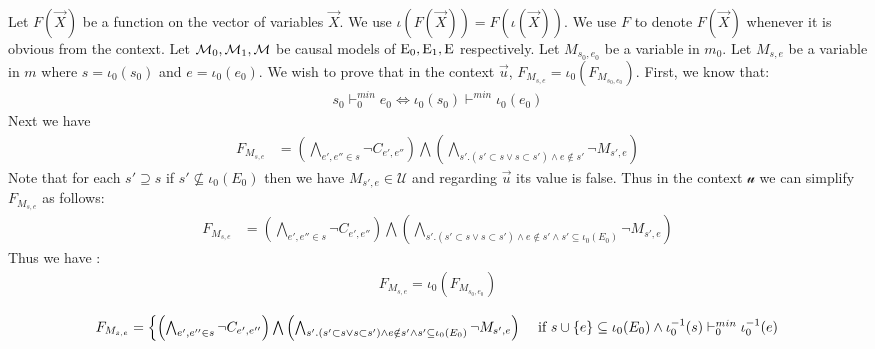 Let $F(\vec X)$ be a function on the vector of variables $\vec X$.
We use $\iota(F(\vec X)) = F(\iota(\vec X))$.
We use $F$ to denote $F(\vec X)$ whenever it is obvious from the context.
Let $\mathcal{M}_0,\mathcal{M}_1,\mathcal{M}$ be causal models of $\mathrm{E}_0,\mathrm{E}_1,\mathrm{E}$ respectively.
Let $M_{s_0,e_0}$ be a variable in $m_0$.
Let $M_{s,e}$ be a variable in $m$ where $s = \iota_0(s_0)$ and $e = \iota_0(e_0)$.
We wish to prove that in the context $\vec u$,
$F_{M_{s,e}} = \iota_0(F_{M_{s_0,e_0}})$.
First, we know that:
\begin{align*}
    s_0 \vdash_0^{min} e_0 \iff \iota_0(s_0) \vdash^{min} \iota_0(e_0)
\end{align*}
Next we have
\begin{align*}
    F_{M_{s,e}} & =
    \left(
    \bigwedge_{ e',e'' \in s}
    \neg C_{e',e''}
    \right) \bigwedge
    \left(
    \bigwedge_{s'. (s' \subset s \vee s \subset s')
        \wedge e \notin s'}
    \neg M_{s',e}
    \right)
\end{align*}
Note that for each $s' \supseteq s$ if $s' \not \subseteq \iota_0(E_0)$ then
we have $M_{s',e} \in \mathcal{U}$ and regarding $\vec u$ its value is false.
Thus in the context $\mathcal{u}$ we can simplify $F_{M_{s,e}}$ as follows:
\begin{align*}
    F_{M_{s,e}} & =
    \left(
    \bigwedge_{ e',e'' \in s}
    \neg C_{e',e''}
    \right) \bigwedge
    \left(
    \bigwedge_{s'. (s' \subset s \vee s \subset s')
        \wedge e \notin s' \wedge s' \subseteq \iota_0(E_0)}
    \neg M_{s',e}
    \right)
\end{align*}
Thus we have :
\begin{align*}
    F_{M_{s,e}} = \iota_0(F_{M_{s_0,e_0}})
\end{align*}

$$
    F_{M_{s,e}} = \begin{cases}
        \left(
        \bigwedge_{ e',e'' \in s}
        \neg C_{e',e''}
        \right) \bigwedge
        \left(
        \bigwedge_{s'. (s' \subset s \vee s \subset s')
            \wedge e \notin s' \wedge s' \subseteq \iota_0(E_0)}
        \neg M_{s',e}
        \right)
        & \text{ if } s \cup \{e\} \subseteq \iota_0(E_0) 
        \wedge \iota_0^{-1}(s) \vdash^{min}_0 \iota_0^{-1}(e)
    \end{cases}
$$